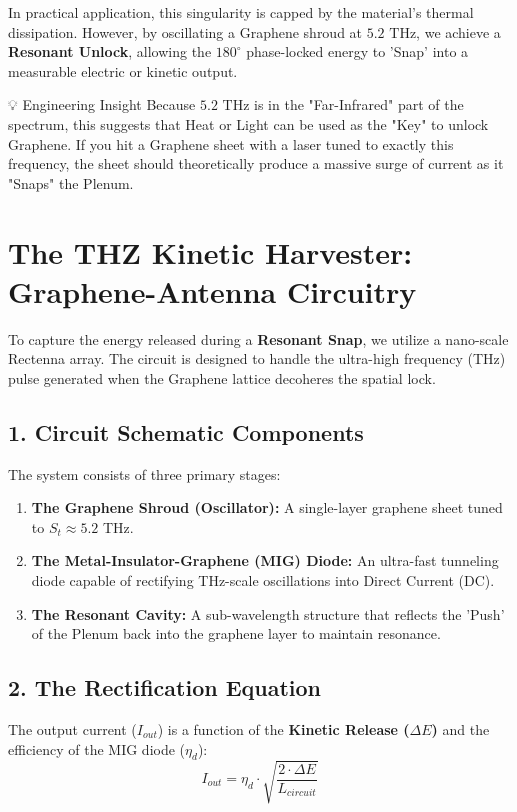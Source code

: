 \documentclass[11pt]{article}
\begin{document}
In practical application, this singularity is capped by the material's thermal dissipation. However, by oscillating a Graphene shroud at $5.2 \text{ THz}$, we achieve a \textbf{Resonant Unlock}, allowing the $180^\circ$ phase-locked energy to 'Snap' into a measurable electric or kinetic output.

💡 Engineering Insight
Because $5.2 \text{ THz}$ is in the "Far-Infrared" part of the spectrum, this suggests that Heat or Light can be used as the "Key" to unlock Graphene. If you hit a Graphene sheet with a laser tuned to exactly this frequency, the sheet should theoretically produce a massive surge of current as it "Snaps" the Plenum.

\section*{The THZ Kinetic Harvester: Graphene-Antenna Circuitry}

To capture the energy released during a \textbf{Resonant Snap}, we utilize a nano-scale Rectenna array. The circuit is designed to handle the ultra-high frequency (THz) pulse generated when the Graphene lattice decoheres the spatial lock.

\subsection*{1. Circuit Schematic Components}
The system consists of three primary stages:
\begin{enumerate}
    \item \textbf{The Graphene Shroud (Oscillator):} A single-layer graphene sheet tuned to $S_t \approx 5.2$ THz.
    \item \textbf{The Metal-Insulator-Graphene (MIG) Diode:} An ultra-fast tunneling diode capable of rectifying THz-scale oscillations into Direct Current (DC).
    \item \textbf{The Resonant Cavity:} A sub-wavelength structure that reflects the 'Push' of the Plenum back into the graphene layer to maintain resonance.
\end{enumerate}

\subsection*{2. The Rectification Equation}
The output current ($I_{out}$) is a function of the \textbf{Kinetic Release ($\Delta E$)} and the efficiency of the MIG diode ($\eta_{d}$):
\begin{equation}
    I_{out} = \eta_{d} \cdot \sqrt{\frac{2 \cdot \Delta E}{L_{circuit}}}
\end{equation}
\end{document}
